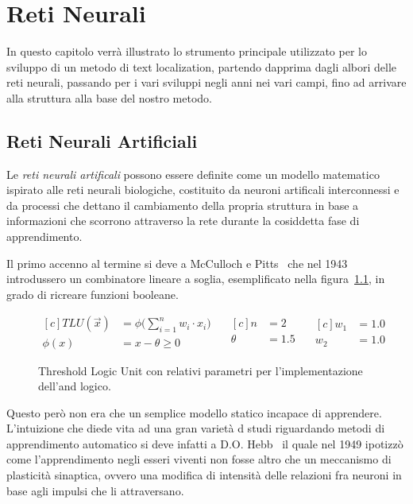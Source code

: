 \chapter{Reti Neurali}

In questo capitolo verrà illustrato lo strumento principale utilizzato per lo sviluppo di un metodo di text localization, partendo dapprima dagli albori delle reti neurali, passando per i vari sviluppi negli anni nei vari campi, fino ad arrivare alla struttura alla base del nostro metodo.

\section{Reti Neurali Artificiali}

Le \textit{reti neurali artificali} possono essere definite come un modello matematico ispirato alle reti neurali biologiche, costituito da neuroni artificali interconnessi e da processi che dettano il cambiamento della propria struttura in base a informazioni che scorrono attraverso la rete durante la cosiddetta fase di apprendimento.

Il primo accenno al termine si deve a McCulloch e Pitts~\cite{McCulloch1943} che nel 1943 introdussero un combinatore lineare a soglia, esemplificato nella figura~\ref{fig:TLU}, in grado di ricreare funzioni booleane.

\begin{figure}[H]
	\centering
	\begin{equation*}
		\begin{aligned}[c]
			TLU(\vec{x}) &= \phi \bigg( \sum_{i=1}^{n}{w_{i} \cdot x_{i}} \bigg) \\
			\phi(x) &= x - \theta \geq 0
		\end{aligned}
		\quad
		\begin{aligned}[c]
			n &= 2 \\
			\theta &= 1.5 \\
		\end{aligned}
		\quad
		\begin{aligned}[c]
			w_{1} &= 1.0 \\
			w_{2} &= 1.0
		\end{aligned}
	\end{equation*}
	\caption{Threshold Logic Unit con relativi parametri per l'implementazione dell'and logico.}
\label{fig:TLU}
\end{figure}

Questo però non era che un semplice modello statico incapace di apprendere.
L'intuizione che diede vita ad una gran varietà d studi riguardando metodi di apprendimento automatico si deve infatti a D.O. Hebb~\cite{Hebb} il quale nel 1949 ipotizzò come l'apprendimento negli esseri viventi non fosse altro che un meccanismo di plasticità sinaptica, ovvero una modifica di intensità delle relazioni fra neuroni in base agli impulsi che li attraversano.

